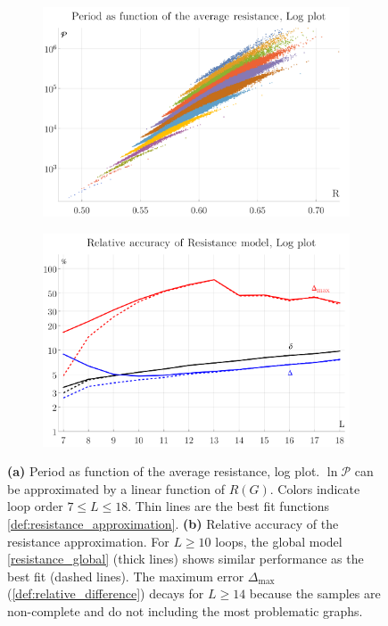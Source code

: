 \documentclass[11pt]{scrartcl}
\numberwithin{equation}{section}
\newcommand{\period}{\mathcal P}
\begin{document}
\begin{figure}[htb]
	\begin{subfigure}{ .49 \linewidth}
		\centering
		\includegraphics[width=\linewidth]{figures/resistance}
		\subcaption{}
		\label{fig:resistance_plot}
	\end{subfigure}
	\begin{subfigure}{ .49 \linewidth}
		\centering
		\includegraphics[width=\linewidth]{figures/resistance_accuracy}
		\subcaption{}
		\label{fig:resistance_accuracy}
	\end{subfigure}
	
	
	\caption{\textbf{(a)} Period as function of the average resistance, log plot.  $\ln \period$ can be approximated by a linear function of $R(G)$. Colors indicate loop order $7 \leq L \leq 18$. Thin lines are the best fit functions \cref{def:resistance_approximation}. \textbf{(b)} Relative accuracy of the resistance approximation. For $L \geq 10$ loops, the global model \cref{resistance_global} (thick lines) shows similar performance as the best fit (dashed lines). The maximum error $\Delta_\text{max}$ (\cref{def:relative_difference}) decays for $L \geq 14$ because the samples are non-complete and do not including the most problematic graphs.  }
\end{figure}
\end{document}
